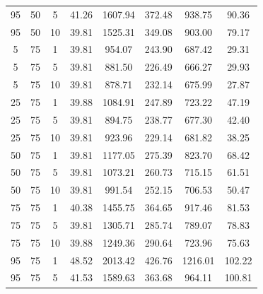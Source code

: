 \begin{table}[H]
\begin{tabular}{ccc|c|c|c|c|c}
95 & 50 & 5 & \cellcolor{gray!36}41.26 & \cellcolor{gray!1}1607.94 & \cellcolor{gray!1}372.48 & \cellcolor{gray!1}938.75 & 90.36\\
95 & 50 & 10 & \cellcolor{gray!50}39.81 & \cellcolor{gray!1}1525.31 & \cellcolor{gray!1}349.08 & \cellcolor{gray!1}903.00 & 79.17\\
5 & 75 & 1 & \cellcolor{gray!50}39.81 & \cellcolor{gray!12}954.07 & \cellcolor{gray!1}243.90 & \cellcolor{gray!42}687.42 & 29.31\\
5 & 75 & 5 & \cellcolor{gray!50}39.81 & \cellcolor{gray!25}881.50 & \cellcolor{gray!4}226.49 & \cellcolor{gray!49}666.27 & 29.93\\
5 & 75 & 10 & \cellcolor{gray!50}39.81 & \cellcolor{gray!25}878.71 & \cellcolor{gray!1}232.14 & \cellcolor{gray!46}675.99 & 27.87\\
25 & 75 & 1 & \cellcolor{gray!50}39.88 & \cellcolor{gray!1}1084.91 & \cellcolor{gray!1}247.89 & \cellcolor{gray!31}723.22 & 47.19\\
25 & 75 & 5 & \cellcolor{gray!50}39.81 & \cellcolor{gray!22}894.75 & \cellcolor{gray!1}238.77 & \cellcolor{gray!45}677.30 & 42.40\\
25 & 75 & 10 & \cellcolor{gray!50}39.81 & \cellcolor{gray!17}923.96 & \cellcolor{gray!1}229.14 & \cellcolor{gray!44}681.82 & 38.25\\
50 & 75 & 1 & \cellcolor{gray!50}39.81 & \cellcolor{gray!1}1177.05 & \cellcolor{gray!1}275.39 & \cellcolor{gray!1}823.70 & 68.42\\
50 & 75 & 5 & \cellcolor{gray!50}39.81 & \cellcolor{gray!1}1073.21 & \cellcolor{gray!1}260.73 & \cellcolor{gray!33}715.15 & 61.51\\
50 & 75 & 10 & \cellcolor{gray!50}39.81 & \cellcolor{gray!6}991.54 & \cellcolor{gray!1}252.15 & \cellcolor{gray!36}706.53 & 50.47\\
75 & 75 & 1 & \cellcolor{gray!45}40.38 & \cellcolor{gray!1}1455.75 & \cellcolor{gray!1}364.65 & \cellcolor{gray!1}917.46 & 81.53\\
75 & 75 & 5 & \cellcolor{gray!50}39.81 & \cellcolor{gray!1}1305.71 & \cellcolor{gray!1}285.74 & \cellcolor{gray!11}789.07 & 78.83\\
75 & 75 & 10 & \cellcolor{gray!50}39.88 & \cellcolor{gray!1}1249.36 & \cellcolor{gray!1}290.64 & \cellcolor{gray!31}723.96 & 75.63\\
95 & 75 & 1 & \cellcolor{gray!1}48.52 & \cellcolor{gray!1}2013.42 & \cellcolor{gray!1}426.76 & \cellcolor{gray!1}1216.01 & 102.22\\
95 & 75 & 5 & \cellcolor{gray!33}41.53 & \cellcolor{gray!1}1589.63 & \cellcolor{gray!1}363.68 & \cellcolor{gray!1}964.11 & 100.81\\

\end{tabular}
\end{table}
